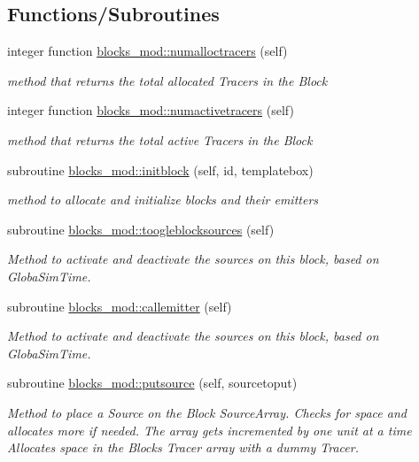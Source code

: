 \subsection*{Functions/\+Subroutines}
\begin{DoxyCompactItemize}
\item 
integer function \mbox{\hyperlink{namespaceblocks__mod_a7202fad0fdc07ff9111e61e3aa513af9}{blocks\+\_\+mod\+::numalloctracers}} (self)
\begin{DoxyCompactList}\small\item\em method that returns the total allocated Tracers in the Block \end{DoxyCompactList}\item 
integer function \mbox{\hyperlink{namespaceblocks__mod_ad8d0816321fe15e1b1e66eacdaaa10e1}{blocks\+\_\+mod\+::numactivetracers}} (self)
\begin{DoxyCompactList}\small\item\em method that returns the total active Tracers in the Block \end{DoxyCompactList}\item 
subroutine \mbox{\hyperlink{namespaceblocks__mod_a534ca69b17b6f54ee07f995b02feff39}{blocks\+\_\+mod\+::initblock}} (self, id, templatebox)
\begin{DoxyCompactList}\small\item\em method to allocate and initialize blocks and their emitters \end{DoxyCompactList}\item 
subroutine \mbox{\hyperlink{namespaceblocks__mod_ab9e57cbf0103b632b2b2dfa4e4d4139c}{blocks\+\_\+mod\+::toogleblocksources}} (self)
\begin{DoxyCompactList}\small\item\em Method to activate and deactivate the sources on this block, based on GlobaSim\+Time. \end{DoxyCompactList}\item 
subroutine \mbox{\hyperlink{namespaceblocks__mod_a2c3cf5113e1422d812c2c869afde2729}{blocks\+\_\+mod\+::callemitter}} (self)
\begin{DoxyCompactList}\small\item\em Method to activate and deactivate the sources on this block, based on GlobaSim\+Time. \end{DoxyCompactList}\item 
subroutine \mbox{\hyperlink{namespaceblocks__mod_a5d11f4958d950c7f436c040bc4133ea0}{blocks\+\_\+mod\+::putsource}} (self, sourcetoput)
\begin{DoxyCompactList}\small\item\em Method to place a Source on the Block Source\+Array. Checks for space and allocates more if needed. The array gets incremented by one unit at a time Allocates space in the Blocks Tracer array with a dummy Tracer. \end{DoxyCompactList}\item 

\end{DoxyCompactItemize}

